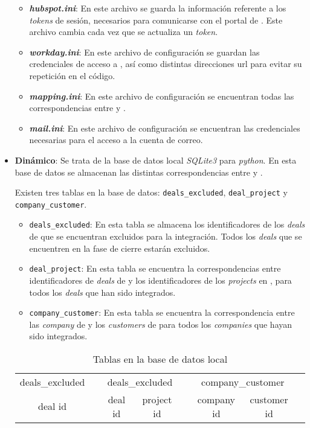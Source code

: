 \begin{itemize}[leftmargin=*]
\begin{itemize}
	\item [\textendash] \textbf{\textit{hubspot.ini}}: En este archivo se guarda la información referente a los \textit{tokens} de sesión, necesarios para comunicarse con el portal de \hs. 
	Este archivo cambia cada vez que se actualiza un \textit{token}.
	\item [\textendash] \textbf{\textit{workday.ini}}: En este archivo de configuración se 
	guardan las credenciales de acceso a \wday{}, así como distintas direcciones url para evitar su repetición en el código.
	\item [\textendash] \textbf{\textit{mapping.ini}}: En este archivo de configuración se encuentran todas las correspondencias entre \hs{} y \wday.
	\item [\textendash] \textbf{\textit{mail.ini}}: En este archivo de configuración se encuentran las credenciales necesarias para el acceso a la cuenta de correo.
\end{itemize}




\item \textbf{Dinámico}: Se trata de la base de datos local \textit{SQLite3} para \textit{python}. %
 En esta base de datos se almacenan las distintas correspondencias entre \hs{} y \wday.
 
 Existen tres tablas en la base de datos: \texttt{deals\_excluded}, \texttt{deal\_project} y \texttt{company\_customer}.
 
 
 \begin{itemize}
	\item \texttt{deals\_excluded}: En esta tabla se almacena los identificadores de los \textit{deals} de \hs{} 
	que se encuentran excluidos para la integración. Todos los \textit{deals} que se encuentren en la fase de
	cierre estarán excluidos.
	\item \texttt{deal\_project}: En esta tabla se encuentra la correspondencias entre identificadores 
	de \textit{deals} de \hs{} y los identificadores de los \textit{projects} en \wday{}, para todos los \textit{deals} que han sido integrados.
	\item \texttt{company\_customer}: En esta tabla se encuentra la correspondencia entre las \textit{company} de \hs{} y los \textit{customers} de \wday{}
	para todos los \textit{companies} que hayan sido integrados.
 \end{itemize}
 

\begin{table}[H]
		\centering
		\begin{tabular}{
		|c|c@{\hskip 1cm} 
		|c|c|c@{\hskip 1cm} 
		|c|c|c@{\hskip 1cm}
		}
		\cline{1-1}\cline{3-4}\cline{6-7}
		deals\_excluded && \multicolumn{2}{c|}{deals\_excluded} && \multicolumn{2}{c|}{company\_customer} \\
	\cline{1-1}\cline{3-4}\cline{6-7}
	deal id && deal id & project id && company id & customer id \\
	\cline{1-1}\cline{3-4}\cline{6-7}
	\end{tabular}
	\caption{Tablas en la base de datos local}
	\label{tab:tables}
\end{table}


\end{itemize}
